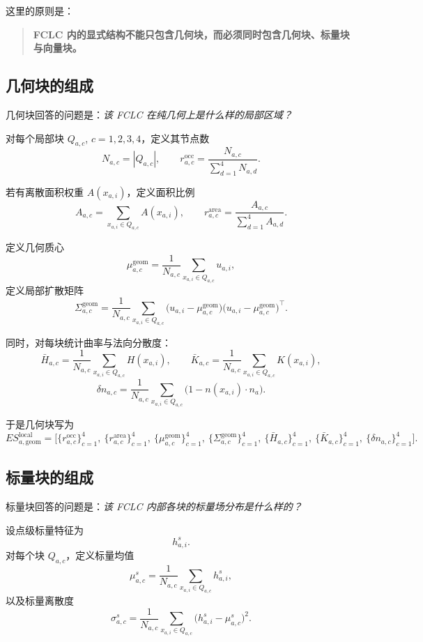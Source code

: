 \documentclass[12pt,a4paper]{ctexart}
\begin{document}
这里的原则是：

\begin{quote}
\textbf{FCLC 内的显式结构不能只包含几何块，而必须同时包含几何块、标量块与向量块。}
\end{quote}

\subsection{几何块的组成}

几何块回答的问题是：\emph{该 FCLC 在纯几何上是什么样的局部区域？}

对每个局部块 \(Q_{a,c}\), \(c=1,2,3,4\)，定义其节点数
\[
N_{a,c}=|Q_{a,c}|,
\qquad
r_{a,c}^{\mathrm{occ}}=\frac{N_{a,c}}{\sum_{d=1}^{4}N_{a,d}}.
\]

若有离散面积权重 \(A(x_{a,i})\)，定义面积比例
\[
A_{a,c}=\sum_{x_{a,i}\in Q_{a,c}}A(x_{a,i}),
\qquad
r_{a,c}^{\mathrm{area}}=\frac{A_{a,c}}{\sum_{d=1}^{4}A_{a,d}}.
\]

定义几何质心
\[
\mu_{a,c}^{\mathrm{geom}}
=
\frac{1}{N_{a,c}}
\sum_{x_{a,i}\in Q_{a,c}}u_{a,i},
\]
定义局部扩散矩阵
\[
\Sigma_{a,c}^{\mathrm{geom}}
=
\frac{1}{N_{a,c}}
\sum_{x_{a,i}\in Q_{a,c}}
\big(u_{a,i}-\mu_{a,c}^{\mathrm{geom}}\big)
\big(u_{a,i}-\mu_{a,c}^{\mathrm{geom}}\big)^\top.
\]

同时，对每块统计曲率与法向分散度：
\[
\bar H_{a,c}
=
\frac{1}{N_{a,c}}
\sum_{x_{a,i}\in Q_{a,c}}H(x_{a,i}),
\qquad
\bar K_{a,c}
=
\frac{1}{N_{a,c}}
\sum_{x_{a,i}\in Q_{a,c}}K(x_{a,i}),
\]
\[
\delta n_{a,c}
=
\frac{1}{N_{a,c}}
\sum_{x_{a,i}\in Q_{a,c}}
\big(1-n(x_{a,i})\cdot n_a\big).
\]

于是几何块写为
\[
ES_{a,\mathrm{geom}}^{\mathrm{local}}
=
\Big[
\{r_{a,c}^{\mathrm{occ}}\}_{c=1}^{4},\
\{r_{a,c}^{\mathrm{area}}\}_{c=1}^{4},\
\{\mu_{a,c}^{\mathrm{geom}}\}_{c=1}^{4},\
\{\Sigma_{a,c}^{\mathrm{geom}}\}_{c=1}^{4},\
\{\bar H_{a,c}\}_{c=1}^{4},\
\{\bar K_{a,c}\}_{c=1}^{4},\
\{\delta n_{a,c}\}_{c=1}^{4}
\Big].
\]

\subsection{标量块的组成}

标量块回答的问题是：\emph{该 FCLC 内部各块的标量场分布是什么样的？}

设点级标量特征为
\[
h_{a,i}^{s}.
\]
对每个块 \(Q_{a,c}\)，定义标量均值
\[
\mu_{a,c}^{s}
=
\frac{1}{N_{a,c}}
\sum_{x_{a,i}\in Q_{a,c}}h_{a,i}^{s},
\]
以及标量离散度
\[
\sigma_{a,c}^{s}
=
\frac{1}{N_{a,c}}
\sum_{x_{a,i}\in Q_{a,c}}
\big(h_{a,i}^{s}-\mu_{a,c}^{s}\big)^2.
\]
\end{document}

